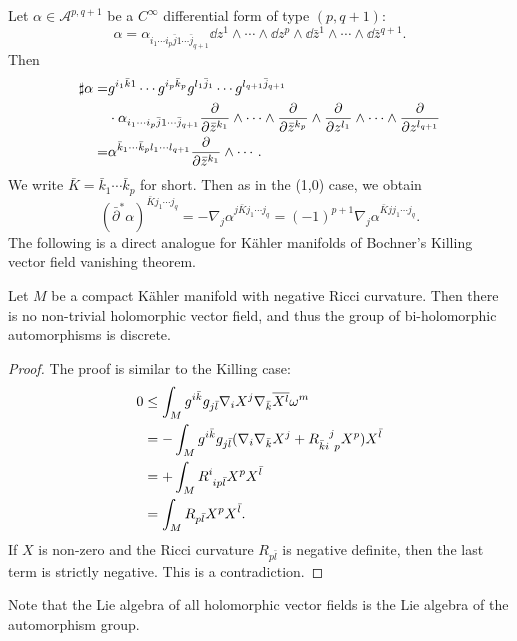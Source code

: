 \documentclass[12pt]{article}
\begin{document}
Let \(\alpha\in \mathcal{A}^{p,q+1}\) be a \(C^\infty\) differential form of type
\((p,q+1)\): \[
  \alpha=\alpha_{i_1\cdots i_p \bar{j}1\cdots \bar{j}_{q+1}}
  \dd{z^1}\wedge\cdots\wedge\dd{z^p}\wedge\dd{\bar{z}^1}\wedge\cdots\wedge
  \dd{\bar{z}^{q+1}}
.\] Then
\begin{align*}
  \sharp\alpha=&g^{i_1\bar{k}1}\cdots g^{i_p\bar{k}_p}g^{l_1\bar{j}_1}\cdots
  g^{l_{q+1}\bar{j}_{q+1}}\\
  &\cdot\alpha_{i_1\cdots i_p \bar{j}1\cdots \bar{j}_{q+1}}
  \pdv{}{\bar{z}^{k_1}}\wedge\cdots\wedge\pdv{}{\bar{z}^{k_p}}\wedge\pdv{}{z^{l_1}}\wedge
  \cdots\wedge\pdv{}{z^{l_{q+1}}} \\
  =&\alpha^{\bar{k}_1\cdots \bar{k}_p l_1\cdots l_{q+1}}\pdv{}{\bar{z}^{k_1}}
  \wedge\cdots 
.\end{align*} 
We write \(\bar{K}=\bar{k}_1\cdots \bar{k}_p\) for short. Then as in the (1,0)
case, we obtain \[
  (\bar{\partial}^*\alpha)^{\bar{K}j_1\cdots j_q}
  =-\nabla_j \alpha^{j\bar{K}j_1\cdots j_q}
  =(-1)^{p+1}\nabla_j \alpha^{\bar{K}jj_1\cdots j_q}
.\] The following is a direct analogue for Kähler manifolds of Bochner's
Killing vector field vanishing theorem.
\begin{theorem}
  Let \(M\) be a compact Kähler manifold with negative Ricci curvature. Then
  there is no non-trivial holomorphic vector field, and thus the group of
  bi-holomorphic automorphisms is discrete.
\end{theorem}
\begin{proof}
  The proof is similar to the Killing case:
  \begin{align*}
    0&\le\int_{M}g^{i\bar{k}}g_{j\bar{l}}\nabla_i X^j \nabla_{\bar{k}}
    \overline{X^l}\omega^m \\
    &=-\int_{M}g^{i\bar{k}}g_{j\bar{l}}(\nabla_i \nabla_{\bar{k}}X^j+
    R\indices{_{\bar{k}i}^j_p}X^p)X^{\bar{l}} \\
    &=+\int_{M}R\indices{^i_{ip\bar{l}}}X^p X^{\bar{l}} \\
    &=\int_{M}R_{p\bar{l}}X^p X^{\bar{l}}
  .\end{align*}
  If \(X\) is non-zero and the Ricci curvature \(R_{p\bar{l}}\) is negative
  definite, then the last term is strictly negative. This is a contradiction.
\end{proof}
Note that the Lie algebra of all holomorphic vector fields is the Lie algebra
of the automorphism group.
\end{document}
